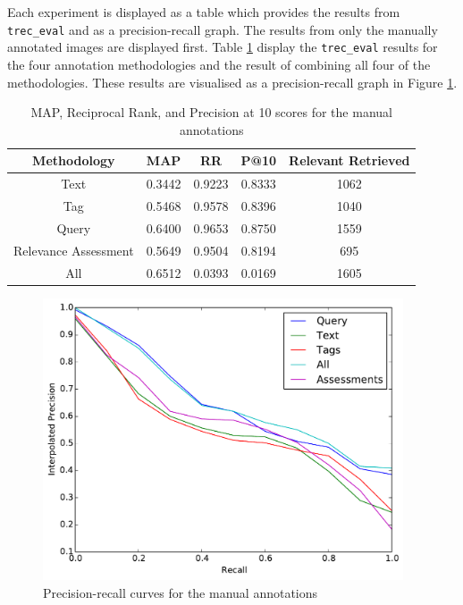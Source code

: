 Each experiment is displayed as a table which provides the results from \verb|trec_eval| and as a precision-recall graph. The results from only the manually annotated images are displayed first. Table \ref{table:manual-results} display the \verb|trec_eval| results for the four annotation methodologies and the result of combining all four of the methodologies. These results are visualised as a precision-recall graph in Figure \ref{fig:manual-result}.

\begin{table}[h]
    \centering
    \begin{tabular}{|c|c|c|c|c|}
        \hline
         Methodology & MAP & RR & P@10 & Relevant Retrieved \\ \hline
         Text & 0.3442 & 0.9223 & 0.8333 & 1062 \\ \hline
         Tag & 0.5468 & 0.9578 & 0.8396 & 1040 \\ \hline
         Query & 0.6400 & 0.9653 & 0.8750 & 1559 \\ \hline
         Relevance Assessment & 0.5649 & 0.9504 & 0.8194 & 695 \\ \hline
         All & 0.6512 & 0.0393 & 0.0169 & 1605 \\ \hline
    \end{tabular}
    \caption{MAP, Reciprocal Rank, and Precision at 10 scores for the manual annotations}
    \label{table:manual-results}
\end{table}

\begin{figure}[htb]
    \centering
    \includegraphics[width=0.95\textwidth]{graphs/manual-result}
    \caption{Precision-recall curves for the manual annotations}
    \label{fig:manual-result}
\end{figure}

